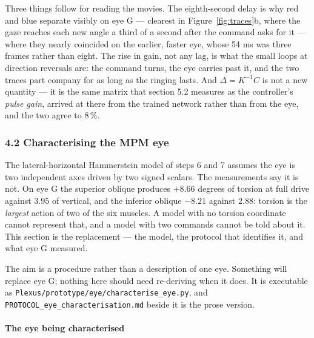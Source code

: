 \documentclass[10pt]{article}
\begin{document}
Three things follow for reading the movies. The eighth-second delay is why red and blue
separate visibly on eye G --- clearest in Figure~\ref{fig:traces}b, where the gaze reaches
each new angle a third of a second after the command asks for it --- where they nearly
coincided on the earlier, faster eye, whose 54 ms was three frames rather than eight. The
rise in gain, not any lag, is what the small loops at direction reversals are: the command
turns, the eye carries past it, and the two traces part company for as long as the ringing
lasts. And $\Delta = K^{-1}C$ is not a new quantity --- it is the same matrix that section
5.2 measures as the controller's \emph{pulse gain}, arrived at there from the trained
network rather than from the eye, and the two agree to 8\,\%.

\subsubsection*{4.2 Characterising the MPM eye}

The lateral-horizontal Hammerstein model of steps 6 and 7 assumes the eye is two independent
axes driven by two signed scalars. The measurements say it is not. On eye G the superior
oblique produces $+8.66$ degrees of torsion at full drive against $3.95$ of vertical, and
the inferior oblique $-8.21$ against $2.88$: torsion is the \emph{largest} action of two of
the six muscles. A model with no torsion coordinate cannot represent that, and a model with
two commands cannot be told about it. This section is the replacement --- the model, the
protocol that identifies it, and what eye G measured.

The aim is a procedure rather than a description of one eye. Something will replace eye G;
nothing here should need re-deriving when it does. It is executable as
\texttt{Plexus/prototype/eye/characterise\_eye.py}, and
\texttt{PROTOCOL\_eye\_characterisation.md} beside it is the prose version.

\paragraph{The eye being characterised}
\end{document}

